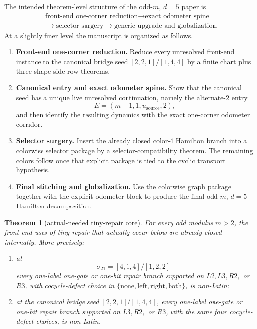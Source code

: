 \documentclass[11pt]{article}
\newtheorem{theorem}{Theorem}[section]
\newcommand{\sig}[2]{\sigma_{#1#2}}
\newcommand{\CanL}{[2,2,1]}
\newcommand{\CanR}{[1,4,4]}
\newcommand{\CanSeed}{\CanL/\CanR}
\begin{document}
The intended theorem-level structure of the odd-$m$, $d=5$ paper is
\[
\begin{aligned}
&\text{front-end one-corner reduction}
\to
\text{exact odometer spine}\\
&\to
\text{selector surgery}
\to
\text{generic upgrade and globalization}.
\end{aligned}
\]
At a slightly finer level the manuscript is organized as follows.
\begin{enumerate}[label=\textup{(\Roman*)},leftmargin=3.0em]
\item \textbf{Front-end one-corner reduction.}
      Reduce every unresolved front-end instance to the canonical bridge seed
      \(\CanSeed\) by a finite chart plus three shape-side row theorems.
\item \textbf{Canonical entry and exact odometer spine.}
      Show that the canonical seed has a unique live unresolved continuation,
      namely the alternate-$2$ entry
      \[
      E=(m-1,1,u_{\mathrm{source}},2),
      \]
      and then identify the resulting dynamics with the exact one-corner
      odometer corridor.
\item \textbf{Selector surgery.}
      Insert the already closed color-$4$ Hamilton branch into a colorwise
      selector package by a selector-compatibility theorem.  The remaining
      colors follow once that explicit package is tied to the cyclic transport
      hypothesis.
\item \textbf{Final stitching and globalization.}
      Use the colorwise graph package together with the explicit odometer block
      to produce the final odd-$m$, $d=5$ Hamilton decomposition.
\end{enumerate}

\begin{theorem}[actual-needed tiny-repair core]
\label{thm:T0-needed}
For every odd modulus $m>2$, the front-end uses of tiny repair that actually
occur below are already closed internally.
More precisely:
\begin{enumerate}[label=\textup{(\arabic*)},leftmargin=2.8em]
\item at
      \[
      \sig21=[4,1,4]/[1,2,2],
      \]
      every one-label one-gate or one-bit repair branch supported on
      \(L2,L3,R2,\) or \(R3\), with cocycle-defect choice in
      \(\{\mathrm{none},\mathrm{left},\mathrm{right},\mathrm{both}\}\),
      is non-Latin;
\item at the canonical bridge seed \(\CanSeed\), every one-label one-gate or
      one-bit repair branch supported on \(L3,R2,\) or \(R3\), with the same
      four cocycle-defect choices, is non-Latin.
\end{enumerate}
\end{theorem}
\end{document}
